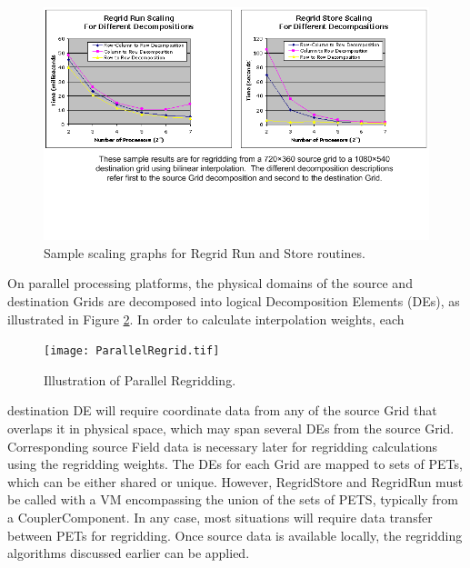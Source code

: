 \begin{center}
\begin{figure}
\caption{Sample scaling graphs for Regrid Run and Store routines. }
\label{fig:RegridScaling}
\includegraphics{RegridScaling.tif}
\end{figure}
\end{center}



On parallel processing platforms, the physical domains of the source and
destination Grids are decomposed into logical Decomposition Elements (DEs), as
illustrated in Figure \ref{fig:ParallelRegrid}.  In order to calculate
interpolation weights, each

\begin{center}
\begin{figure}
\caption{Illustration of Parallel Regridding. }
\label{fig:ParallelRegrid}
\texttt{[image: ParallelRegrid.tif]}
\end{figure}
\end{center}

destination DE will require coordinate data from any of the source Grid that
overlaps it in physical space, which may span several DEs from the source Grid.
Corresponding source Field data is necessary later for regridding calculations
using the regridding weights.  The DEs for each Grid are mapped to sets of PETs,
which can be either shared or unique.  However, RegridStore and RegridRun must
be called with a VM encompassing the union of the sets of PETS, typically from
a CouplerComponent.  In any case, most situations will require data transfer
between PETs for regridding.  Once source data is available locally, the
regridding algorithms discussed earlier can be applied.

